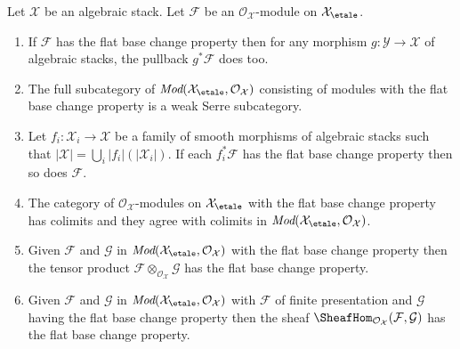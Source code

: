 \begin{lemma}
\label{lemma-check-flat-comparison-on-etale-covering}
Let $\mathcal{X}$ be an algebraic stack. Let $\mathcal{F}$
be an $\mathcal{O}_\mathcal{X}$-module on $\mathcal{X}_\etale$.
\begin{enumerate}
\item If $\mathcal{F}$ has the flat base change property then for any morphism
$g : \mathcal{Y} \to \mathcal{X}$ of algebraic stacks, the
pullback $g^*\mathcal{F}$ does too.
\item The full subcategory of
$\textit{Mod}(\mathcal{X}_\etale, \mathcal{O}_\mathcal{X})$
consisting of modules with the flat base change property
is a weak Serre subcategory.
\item  Let $f_i : \mathcal{X}_i \to \mathcal{X}$ be a family of
smooth morphisms of algebraic stacks such that
$|\mathcal{X}| = \bigcup_i |f_i|(|\mathcal{X}_i|)$. If each
$f_i^*\mathcal{F}$ has the flat base change property then so does
$\mathcal{F}$.
\item The category of $\mathcal{O}_\mathcal{X}$-modules
on $\mathcal{X}_\etale$ with the flat base change property
has colimits and they agree with colimits in
$\textit{Mod}(\mathcal{X}_\etale, \mathcal{O}_\mathcal{X})$.
\item Given $\mathcal{F}$ and $\mathcal{G}$ in
$\textit{Mod}(\mathcal{X}_\etale, \mathcal{O}_\mathcal{X})$
with the flat base change property then the tensor product
$\mathcal{F} \otimes_{\mathcal{O}_\mathcal{X}} \mathcal{G}$
has the flat base change property.
\item Given $\mathcal{F}$ and $\mathcal{G}$ in
$\textit{Mod}(\mathcal{X}_\etale, \mathcal{O}_\mathcal{X})$
with $\mathcal{F}$ of finite presentation and $\mathcal{G}$ having
the flat base change property then the sheaf
$\SheafHom_{\mathcal{O}_\mathcal{X}}(\mathcal{F}, \mathcal{G})$
has the flat base change property.
\end{enumerate}
\end{lemma}


